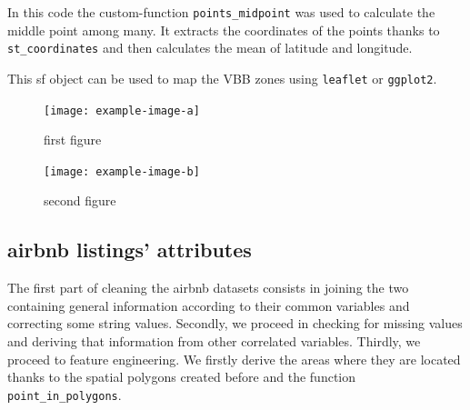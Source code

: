 

In this code the custom-function \texttt{points\_midpoint} was used to calculate the middle point among many. It extracts the coordinates of the points thanks to \texttt{st\_coordinates} and then calculates the mean of latitude and longitude.



This sf object can be used to map the VBB zones using \texttt{leaflet} or \texttt{ggplot2}.

\begin{figure}
    \centering
    \begin{minipage}{0.45\textwidth}
        \centering
        \texttt{[image: example-image-a]} %
        \caption{first figure}
    \end{minipage}\hfill
    \begin{minipage}{0.45\textwidth}
        \centering
        \texttt{[image: example-image-b]} %
        \caption{second figure}
    \end{minipage}
\end{figure}

\subsection{airbnb listings' attributes}

The first part of cleaning the airbnb datasets consists in joining the two containing general information according to their common variables and correcting some string values.
Secondly, we proceed in checking for missing values and deriving that information from other correlated variables.
Thirdly, we proceed to feature engineering.
We firstly derive the areas where they are located thanks to the spatial polygons created before and the function \texttt{point\_in\_polygons}.



